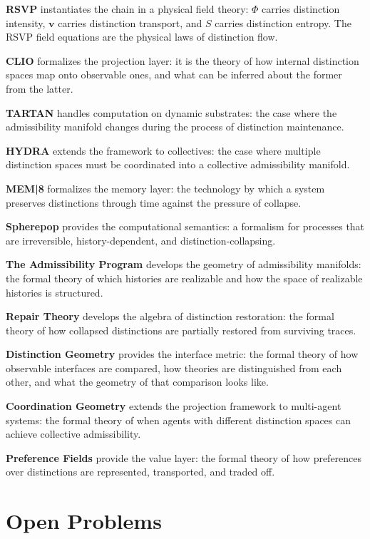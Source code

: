 \documentclass[12pt,a4paper]{book}
\theoremstyle{remark}
\theoremstyle{definition}
\begin{document}
\textbf{RSVP} instantiates the chain in a physical field theory: $\Phi$
carries distinction intensity, $\mathbf{v}$ carries distinction transport,
and $S$ carries distinction entropy. The RSVP field equations are the
physical laws of distinction flow.

\textbf{CLIO} formalizes the projection layer: it is the theory of how
internal distinction spaces map onto observable ones, and what can be
inferred about the former from the latter.

\textbf{TARTAN} handles computation on dynamic substrates: the case where
the admissibility manifold changes during the process of distinction
maintenance.

\textbf{HYDRA} extends the framework to collectives: the case where
multiple distinction spaces must be coordinated into a collective
admissibility manifold.

\textbf{MEM|8} formalizes the memory layer: the technology by which
a system preserves distinctions through time against the pressure of
collapse.

\textbf{Spherepop} provides the computational semantics: a formalism
for processes that are irreversible, history-dependent, and
distinction-collapsing.

\textbf{The Admissibility Program} develops the geometry of admissibility
manifolds: the formal theory of which histories are realizable and how
the space of realizable histories is structured.

\textbf{Repair Theory} develops the algebra of distinction restoration:
the formal theory of how collapsed distinctions are partially restored
from surviving traces.

\textbf{Distinction Geometry} provides the interface metric: the formal
theory of how observable interfaces are compared, how theories are
distinguished from each other, and what the geometry of that comparison
looks like.

\textbf{Coordination Geometry} extends the projection framework to
multi-agent systems: the formal theory of when agents with different
distinction spaces can achieve collective admissibility.

\textbf{Preference Fields} provide the value layer: the formal theory
of how preferences over distinctions are represented, transported, and
traded off.

\chapter{Open Problems}
\end{document}
